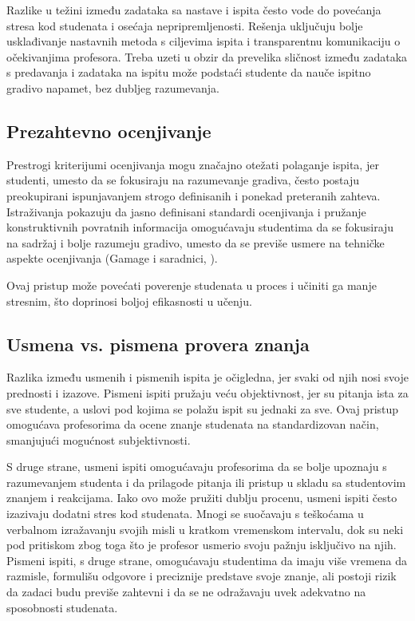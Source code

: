 \documentclass[a4paper]{article}
\begin{document}
Razlike u težini između zadataka sa nastave i ispita često vode do povećanja stresa kod studenata i osećaja nepripremljenosti. Rešenja uključuju bolje usklađivanje nastavnih metoda s ciljevima ispita i transparentnu komunikaciju o očekivanjima profesora. Treba uzeti u obzir da prevelika sličnost između zadataka s predavanja i zadataka na ispitu može podstaći studente da nauče ispitno gradivo napamet, bez dubljeg razumevanja.

\subsection{Prezahtevno ocenjivanje}

Prestrogi kriterijumi ocenjivanja mogu značajno otežati polaganje ispita, jer studenti, umesto da se fokusiraju na razumevanje gradiva, često postaju preokupirani ispunjavanjem strogo definisanih i ponekad preteranih zahteva. Istraživanja pokazuju da jasno definisani standardi ocenjivanja i pružanje konstruktivnih povratnih informacija omogućavaju studentima da se fokusiraju na sadržaj i bolje razumeju gradivo, umesto da se previše usmere na tehničke aspekte ocenjivanja (Gamage i saradnici, \cite{gamage2022rethinking}). 

Ovaj pristup može povećati poverenje studenata u proces i učiniti ga manje stresnim, što doprinosi boljoj efikasnosti u učenju.

\subsection{Usmena vs. pismena provera znanja}

Razlika između usmenih i pismenih ispita je očigledna, jer svaki od njih nosi svoje prednosti i izazove. Pismeni ispiti pružaju veću objektivnost, jer su pitanja ista za sve studente, a uslovi pod kojima se polažu ispit su jednaki za sve. Ovaj pristup omogućava profesorima da ocene znanje studenata na standardizovan način, smanjujući mogućnost subjektivnosti.

S druge strane, usmeni ispiti omogućavaju profesorima da se bolje upoznaju s razumevanjem studenta i da prilagode pitanja ili pristup u skladu sa studentovim znanjem i reakcijama. Iako ovo može pružiti dublju procenu, usmeni ispiti često izazivaju dodatni stres kod studenata. Mnogi se suočavaju s teškoćama u verbalnom izražavanju svojih misli u kratkom vremenskom intervalu, dok su neki pod pritiskom zbog toga što je profesor usmerio svoju pažnju isključivo na njih. Pismeni ispiti, s druge strane, omogućavaju studentima da imaju više vremena da razmisle, formulišu odgovore i preciznije predstave svoje znanje, ali postoji rizik da zadaci budu previše zahtevni i da se ne odražavaju uvek adekvatno na sposobnosti studenata.
\end{document}
